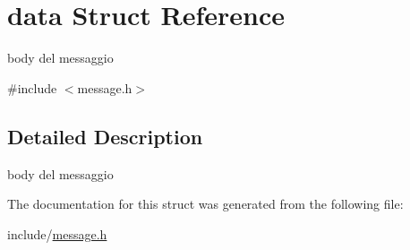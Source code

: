 \hypertarget{structdata}{}\section{data Struct Reference}
\label{structdata}


body del messaggio  




{\ttfamily \#include $<$message.\+h$>$}



\subsection{Detailed Description}
body del messaggio 

The documentation for this struct was generated from the following file\+:\begin{DoxyCompactItemize}
\item 
include/\hyperlink{message_8h}{message.\+h}\end{DoxyCompactItemize}
